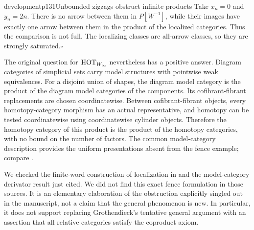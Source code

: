 \begin{dcomment}{development}{p131}{Unbounded zigzags obstruct infinite products}
Take $x_n=0$ and $y_n=2n$. There is no arrow between them in $P[W^{-1}]$, while their images have exactly one arrow between them in the product of the localized categories. Thus the comparison is not full. The localizing classes are all-arrow classes, so they are strongly saturated.\hfill$\square$

The original question for $\mathrm{HOT}_{W_\infty}$ nevertheless has a positive answer. Diagram categories of simplicial sets carry model structures with pointwise weak equivalences. For a disjoint union of shapes, the diagram model category is the product of the diagram model categories of the components. Its cofibrant-fibrant replacements are chosen coordinatewise. Between cofibrant-fibrant objects, every homotopy-category morphism has an actual representative, and homotopy can be tested coordinatewise using coordinatewise cylinder objects. Therefore the homotopy category of this product is the product of the homotopy categories, with no bound on the number of factors. The common model-category description provides the uniform presentations absent from the fence example; compare \citet[Proposition~1.30]{Groth2013}.

We checked the finite-word construction of localization in \citet[Chapter~I, \S1]{GabrielZisman1967} and the model-category derivator result just cited. We did not find this exact fence formulation in those sources. It is an elementary elaboration of the obstruction explicitly singled out in the manuscript, not a claim that the general phenomenon is new. In particular, it does not support replacing Grothendieck's tentative general argument with an assertion that all relative categories satisfy the coproduct axiom.
\end{dcomment}


